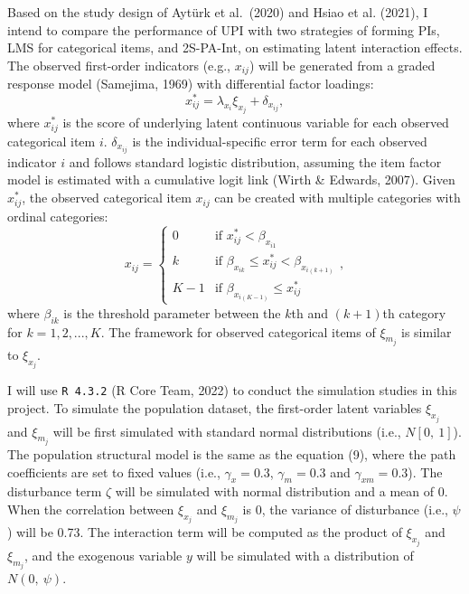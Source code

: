 \documentclass[
  11pt,
  man]{apa6}
\begin{document}
Based on the study design of Aytürk et al.~(2020) and Hsiao et al. (2021), I intend to compare the performance of UPI with two strategies of forming PIs, LMS for categorical items, and 2S-PA-Int, on estimating latent interaction effects. The observed first-order indicators (e.g., \(x_{ij}\)) will be generated from a graded response model (Samejima, 1969) with differential factor loadings:
\begin{equation}
x_{ij}^* = \lambda_{x_{i}}\xi_{x_{j}} + \delta_{x_{ij}},
\end{equation}
where \(x_{ij}^*\) is the score of underlying latent continuous variable for each observed categorical item \(i\). \(\delta_{x_{ij}}\) is the individual-specific error term for each observed indicator \(i\) and follows standard logistic distribution, assuming the item factor model is estimated with a cumulative logit link (Wirth \& Edwards, 2007). Given \(x_{ij}^*\), the observed categorical item \(x_{ij}\) can be created with multiple categories with ordinal categories:
\begin{equation}
  x_{ij} =
    \begin{cases}
      0 & \text{if $x_{ij}^* < \beta_{x_{i1}}$}\\
      k & \text{if $\beta_{x_{ik}} \le x_{ij}^* < \beta_{x_{i(k + 1)}}$}\\
      K - 1 & \text{if $\beta_{x_{i(K - 1)}} \le x_{ij}^*$}
    \end{cases},      
\end{equation}
where \(\beta_{ik}\) is the threshold parameter between the \(k\)th and \((k + 1)\)th category for \(k = 1, 2,...,K\). The framework for observed categorical items of \(\xi_{m_{j}}\) is similar to \(\xi_{x_{j}}\).

I will use \texttt{R\ 4.3.2} (R Core Team, 2022) to conduct the simulation studies in this project. To simulate the population dataset, the first-order latent variables \(\xi_{x_{j}}\) and \(\xi_{m_{j}}\) will be first simulated with standard normal distributions (i.e., \(N[0, \ 1]\)). The population structural model is the same as the equation (9), where the path coefficients are set to fixed values (i.e., \(\gamma_{x} = 0.3\), \(\gamma_{m} = 0.3\) and \(\gamma_{xm} = 0.3\)). The disturbance term \(\zeta\) will be simulated with normal distribution and a mean of 0. When the correlation between \(\xi_{x_{j}}\) and \(\xi_{m_{j}}\) is 0, the variance of disturbance (i.e., \(\psi\)) will be 0.73. The interaction term will be computed as the product of \(\xi_{x_{j}}\) and \(\xi_{m_{j}}\), and the exogenous variable \(y\) will be simulated with a distribution of \(N(0, \ \psi)\).
\end{document}
